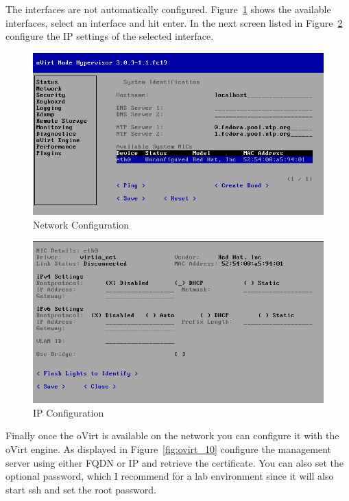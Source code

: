 \documentclass[11pt,letterpaper,oneside]{book}
\begin{document}
The interfaces are not automatically configured.  Figure~\ref{fig:ovirt_07} shows the available interfaces, select an interface and hit enter.  In the next screen listed in Figure~\ref{fig:ovirt_08} configure the IP settings of the selected interface.

\begin{figure}[ht]
	\caption{Network Configuration}
	\centering
	\label{fig:ovirt_07}
	\includegraphics[scale=0.40]{./pictures/ovirt_009.png}
\end{figure}

\begin{figure}[ht]
	\caption{IP Configuration}
	\centering
	\label{fig:ovirt_08}
	\includegraphics[scale=0.40]{./pictures/ovirt_010.png}
\end{figure}

Finally once the oVirt is available on the network you can configure it with the oVirt engine.  As displayed in Figure~\ref{fig:ovirt_10} configure the management server using either FQDN or IP and retrieve the certificate.  You can also set the optional password, which I recommend for a lab environment since it will also start ssh and set the root password.
\end{document}
